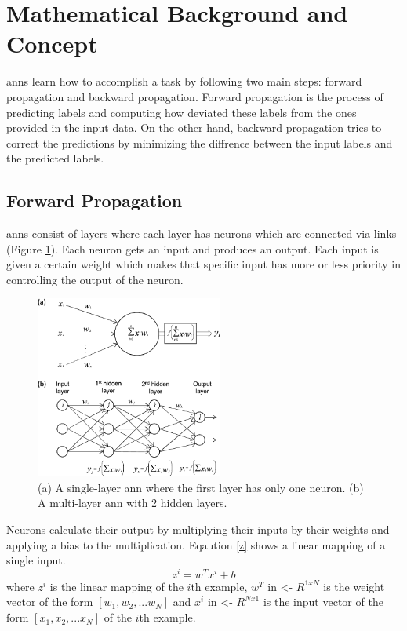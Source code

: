 \documentclass[runningheads]{llncs}
\begin{document}
\section{Mathematical Background and Concept}
\gls{anns} learn how to accomplish a task by following two main steps:
forward propagation and backward propagation. Forward propagation is the process of
predicting labels and computing how deviated these labels from the ones provided in the input data.
On the other hand, backward propagation tries to correct the predictions by minimizing
the diffrence between the input labels and the predicted labels. 
\subsection{Forward Propagation}
\gls{anns} consist of layers where each layer has neurons which are connected via links (Figure \ref{nn}). Each neuron gets an input and produces an output. 
Each input is given a certain weight which makes that specific input has more or less priority in controlling the output of the neuron.

\begin{figure}[H]
    \label{nn}
    \centering
    \includegraphics[height=6cm]{nn}
    \caption{(a) A single-layer \gls{ann} where the first layer has only one neuron. 
    (b) A multi-layer \gls{ann} with 2 hidden layers. 
    }
\end{figure}

Neurons calculate their output by multiplying their inputs by their weights and applying a bias to the multiplication. Eqaution \ref{z}
shows a linear mapping of a single input.
\begin{equation}
\label{z}
    z^i = w^Tx^i + b
\end{equation}
where $z^i$ is the linear mapping of the $i$th example,  $w^T$ in <- $ R^{1xN} $ is the weight vector of the form $[w_1, w_2, ... w_N]$ and
$x^i$ in <- $ R^{Nx1} $ is the input vector  of the form $[x_1, x_2, ... x_N]$ of the $i$th example.
\end{document}
